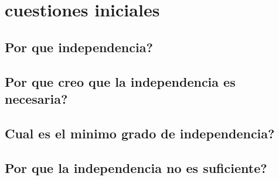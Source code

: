 \chapter{cuestiones iniciales}
\section{Por que independencia?}
\section{Por que creo que la independencia es necesaria?}
\section{Cual es el minimo grado de independencia?}
\section{Por que la independencia no es suficiente?}

